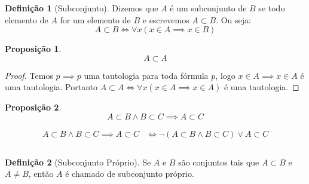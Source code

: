 \documentclass{article}
\newtheorem{prop}{Proposição}[section]
\theoremstyle{theorem}
\theoremstyle{lemma}
\theoremstyle{definition}
\newtheorem{definicao}{Definição}[section]
\theoremstyle{remark}
\begin{document}
\begin{definicao}[Subconjunto]
	Dizemos que $A$ é um subconjunto de $B$ se  todo elemento de $A$ for um elemento de $B$ e escrevemos $A\subset B$. Ou seja:
	$$ A \subset B \iff \forall x ( x\in A \implies x \in B)$$ 
\end{definicao}
\begin{prop}
	$$A\subset A$$
\end{prop}
\begin{proof}
	Temos $p \implies p$ uma tautologia para toda fórmula $p$, logo $x\in A \implies x \in A$ é uma tautologia. Portanto $A \subset A \iff \forall x ( x \in A \implies x\in A) $ é uma tautologia.
\end{proof}
\begin{prop}
	$$A\subset B \land B \subset C \implies A \subset C$$
\end{prop}
	\begin{align*}
		A\subset B \land B\subset C \implies A \subset C &\iff \neg ( A\subset B \land B\subset C) \lor  A \subset C\\~\\
	\end{align*}
\begin{definicao}[Subconjunto Próprio]
	Se $A$ e $B$ são conjuntos tais que $A\subset B$ e $A \neq B$, então $A$ é chamado de subconjunto próprio.
\end{definicao}
\end{document}

